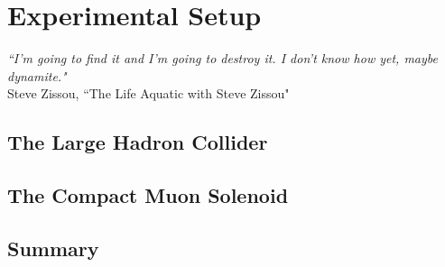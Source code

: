 \chapter{Experimental Setup}
\label{sec:expt}

\begin{center}
\begin{footnotesize}
{\it{``I'm going to find it and I'm going to destroy it. I don't know how yet, maybe dynamite."}}\\
Steve Zissou, ``The Life Aquatic with Steve Zissou"
\end{footnotesize}
\end{center}

\section{The Large Hadron Collider}
\label{sec:LHC}

\section{The Compact Muon Solenoid}
\label{sec:CMS}

\section{Summary}
\label{sec:expt_summary}